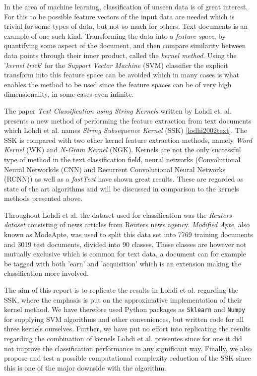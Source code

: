 
In the area of machine learning, classification of unseen data is of great interest. For this to be possible feature vectors of the input data are needed which is trivial for some types of data, but not so much for others. Text documents is an example of one such kind. Transforming the data into a \textit{feature space}, by quantifying some aspect of the document, and then compare similarity between data points through their inner product, called the \textit{kernel method}. Using the '\textit{kernel trick}' for the \textit{Support Vector Machine} (SVM) classifier the explicit transform into this feature space can be avoided which in many cases is what enables the method to be used since the feature spaces can be of very high dimensionality, in some cases even infinite. 

The paper \textit{Text Classification using String Kernels} written by Lohdi et. al. presents a new method of performing the feature extraction from text documents which Lohdi et al. names \textit{String Subsequence Kernel} (SSK) \ref{lodhi2002text}. The SSK is compared with two other kernel feature extraction methods, namely \textit{Word Kernel} (WK) and \textit{N-Gram Kernel} (NGK). Kernels are not the only successful type of method in the text classification field, neural networks (Convolutional Neural Networkds (CNN) and Recurrent Convolutional Neural Networks (RCNN)) as well as a \textit{fastText} have shown great results. These are regarded as state of the art algorithms and will be discussed in comparison to the kernels methods presented above. 

Throughout Lohdi et al. the dataset used for classification was the \textit{Reuters dataset} consisting of news articles from Reuters news agency. \textit{Modified Apte}, also known as ModeApte, was used to split this data set into 7769 training documents and 3019 test documents, divided into 90 classes. These classes are however not mutually exclusive which is common for text data, a document can for example be tagged with both 'earn' and 'acquisition' which is an extension making the classification more involved.

The aim of this report is to replicate the results in Lohdi et al. regarding the SSK, where the emphasis is put on the approximative implementation of their kernel method. We have therefore used Python packages as \texttt{Sklearn} and \texttt{Numpy} for supplying SVM algorithms and other conveniences, but written code for all three kernels ourselves. Further, we have put no effort into replicating the results regarding the combination of kernels Lohdi et al. presentes since for one it did not improve the classification performance in any significant way. Finally, we also propose and test a possible computational complexity reduction of the SSK since this is one of the major downside with the algorithm.

